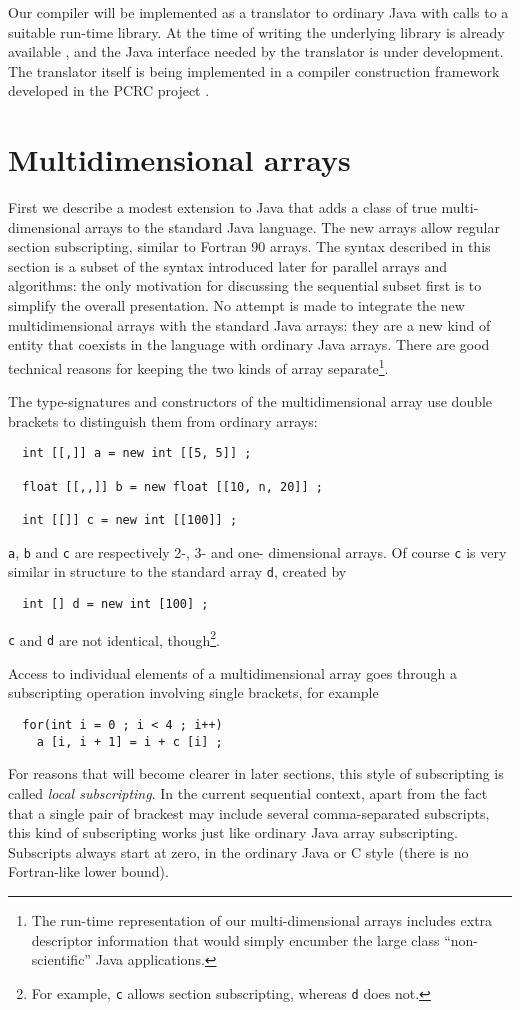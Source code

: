 Our compiler will be implemented as a translator to ordinary Java with
calls to a suitable run-time library.  At the time of writing the
underlying library is already available \cite{NPAC_PCRC_kernel}, and
the Java interface needed by the translator is under development.  The
translator itself is being implemented in a compiler construction
framework developed in the PCRC project \cite{Common_runtime,PCRC_based}.

\section{Multidimensional arrays\label{multiDim}}

First we describe a modest extension to Java that adds a class of true
multi-dimensional arrays to the standard Java language.  The new arrays
allow regular section subscripting, similar to Fortran 90 arrays.  The
syntax described in this section is a subset of the syntax introduced
later for parallel arrays and algorithms: the only motivation for
discussing the sequential subset first is to simplify the overall
presentation.
No attempt is made to integrate the new multidimensional arrays
with the standard Java arrays: they are a new kind of entity that
coexists in the language with ordinary Java arrays.  There
are good technical reasons for keeping the two kinds of array
separate\footnote{The run-time representation of our multi-dimensional arrays
includes extra descriptor information that would simply
encumber the large class ``non-scientific'' Java applications.}.

The type-signatures and constructors of the multidimensional array use
double brackets to distinguish them from ordinary arrays:
\small
\begin{verbatim}
  int [[,]] a = new int [[5, 5]] ;

  float [[,,]] b = new float [[10, n, 20]] ;

  int [[]] c = new int [[100]] ;
\end{verbatim}
\normalsize
{\tt a}, {\tt b} and {\tt c} are respectively 2-, 3- and one- dimensional
arrays.  Of course {\tt c} is very similar in structure to the standard
array {\tt d}, created by
\small
\begin{verbatim}
  int [] d = new int [100] ;
\end{verbatim}
\normalsize
{\tt c} and {\tt d} are not identical, though\footnote{For example,
{\tt c} allows section subscripting, whereas {\tt d} does not.}.

Access to individual elements of a multidimensional array goes through
a subscripting operation involving single brackets, for example
\small
\begin{verbatim}
  for(int i = 0 ; i < 4 ; i++)
    a [i, i + 1] = i + c [i] ;
\end{verbatim}
\normalsize
For reasons that will become clearer in later sections, this style of
subscripting is called {\em local subscripting}.  In the current
sequential context, apart from the fact that a single pair of brackest
may include several comma-separated subscripts, this kind of
subscripting works just like ordinary Java array subscripting.
Subscripts always start at zero, in the ordinary Java or C style (there
is no Fortran-like lower bound).

